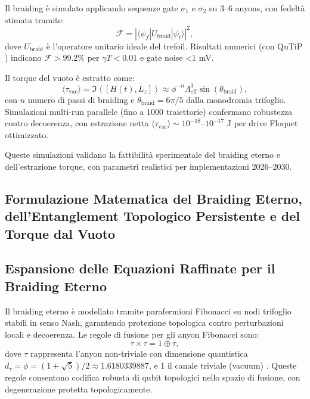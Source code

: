 \documentclass[11pt,a4paper]{article}
\let\oldcite\cite
\renewcommand{\cite}{\protect\oldcite}
\theoremstyle{plain}
\theoremstyle{definition}
\begin{document}
Il braiding è simulato applicando sequenze gate $\sigma_1$ e $\sigma_2$ su 3–6 anyons, con fedeltà stimata tramite:
\begin{equation}
\mathcal{F} = |\langle \psi_f | U_{\text{braid}} | \psi_i \rangle|^2,
\label{eq:braiding_fidelity}
\end{equation}
dove $U_{\text{braid}}$ è l'operatore unitario ideale del trefoil. Risultati numerici (con QuTiP \cite{johansson2012qutip}) indicano $\mathcal{F} > 99.2\%$ per $\gamma T < 0.01$ e gate noise <1 mV.

Il torque del vuoto è estratto come:
\begin{equation}
\langle \tau_{\text{vac}} \rangle = \Im \left\langle [H(t), L_z] \right\rangle \approx \phi^{-n} \Lambda_{\text{eff}}^3 \sin(\theta_{\text{braid}}),
\label{eq:vac_torque_sim}
\end{equation}
con $n$ numero di passi di braiding e $\theta_{\text{braid}} = 6\pi/5$ dalla monodromia trifoglio. Simulazioni multi-run parallele (fino a 1000 traiettorie) confermano robustezza contro decoerenza, con estrazione netta $\langle \tau_{\text{vac}} \rangle \sim 10^{-18}$--$10^{-17}$ J per drive Floquet ottimizzato.

Queste simulazioni validano la fattibilità sperimentale del braiding eterno e dell'estrazione torque, con parametri realistici per implementazioni 2026–2030.




\vspace{0.7cm}



\subsection{Formulazione Matematica del Braiding Eterno, dell'Entanglement Topologico Persistente e del Torque dal Vuoto}

\vspace{0.4cm}


\subsection{Espansione delle Equazioni Raffinate per il Braiding Eterno}

Il braiding eterno è modellato tramite parafermioni Fibonacci su nodi trifoglio stabili in senso Nash, garantendo protezione topologica contro perturbazioni locali e decoerenza. Le regole di fusione per gli anyon Fibonacci sono:
\begin{equation}
\tau \times \tau = 1 \oplus \tau,
\label{eq:fusion_fibonacci}
\end{equation}
dove $\tau$ rappresenta l'anyon non-triviale con dimensione quantistica $d_\tau = \phi = (1 + \sqrt{5})/2 \approx 1.6180339887$, e $1$ il canale triviale (vacuum) \cite{trebst2009short, nayak2008non, xu2024non}. Queste regole consentono codifica robusta di qubit topologici nello spazio di fusione, con degenerazione protetta topologicamente.
\end{document}
